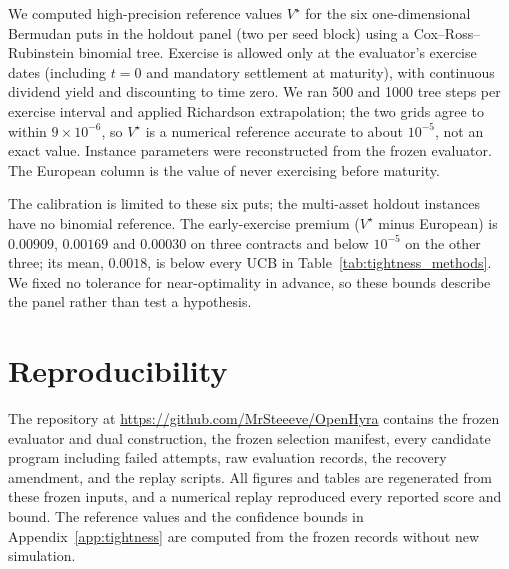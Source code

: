 \documentclass{article}
\begin{document}
We computed high-precision reference values $V^\star$ for the six one-dimensional Bermudan puts in the holdout panel (two per seed block) using a Cox--Ross--Rubinstein binomial tree. Exercise is allowed only at the evaluator's exercise dates (including $t{=}0$ and mandatory settlement at maturity), with continuous dividend yield and discounting to time zero. We ran 500 and 1000 tree steps per exercise interval and applied Richardson extrapolation; the two grids agree to within $9 \times 10^{-6}$, so $V^\star$ is a numerical reference accurate to about $10^{-5}$, not an exact value. Instance parameters were reconstructed from the frozen evaluator. The European column is the value of never exercising before maturity.

\begin{table}[H]
\centering
\footnotesize
\caption{The six holdout put contracts and their reference values ($K = 1$).}
\label{tab:tightness_instances}
\setlength{\tabcolsep}{3.5pt}

\end{table}

\begin{table}[H]
\centering
\footnotesize
\caption{Decomposition of the raw certificate width on the holdout puts (means over six cells, $K = 1$). UCB is the one-sided 95\% upper confidence bound $\overline{(V^\star{-}\hat L)} + 1.645\,\bigl(\sum_i \mathrm{SE}_{L,i}^2\bigr)^{1/2}/6$, treating $V^\star$ as exact and cells as independent. ``Within MC noise'' counts cells with $|V^\star{-}\hat L| \le 1.96\,\mathrm{SE}_L$. $^\dagger$Identical on the puts (Appendix~\ref{app:protocol}).}
\label{tab:tightness_methods}
\setlength{\tabcolsep}{4pt}

\end{table}

\noindent The calibration is limited to these six puts; the multi-asset holdout instances have no binomial reference. The early-exercise premium ($V^\star$ minus European) is $0.00909$, $0.00169$ and $0.00030$ on three contracts and below $10^{-5}$ on the other three; its mean, $0.0018$, is below every UCB in Table~\ref{tab:tightness_methods}. We fixed no tolerance for near-optimality in advance, so these bounds describe the panel rather than test a hypothesis.

\section{Reproducibility}
\label{app:repro}

The repository at \url{https://github.com/MrSteeeve/OpenHyra} contains the frozen evaluator and dual construction, the frozen selection manifest, every candidate program including failed attempts, raw evaluation records, the recovery amendment, and the replay scripts. All figures and tables are regenerated from these frozen inputs, and a numerical replay reproduced every reported score and bound. The reference values and the confidence bounds in Appendix~\ref{app:tightness} are computed from the frozen records without new simulation.
\end{document}
